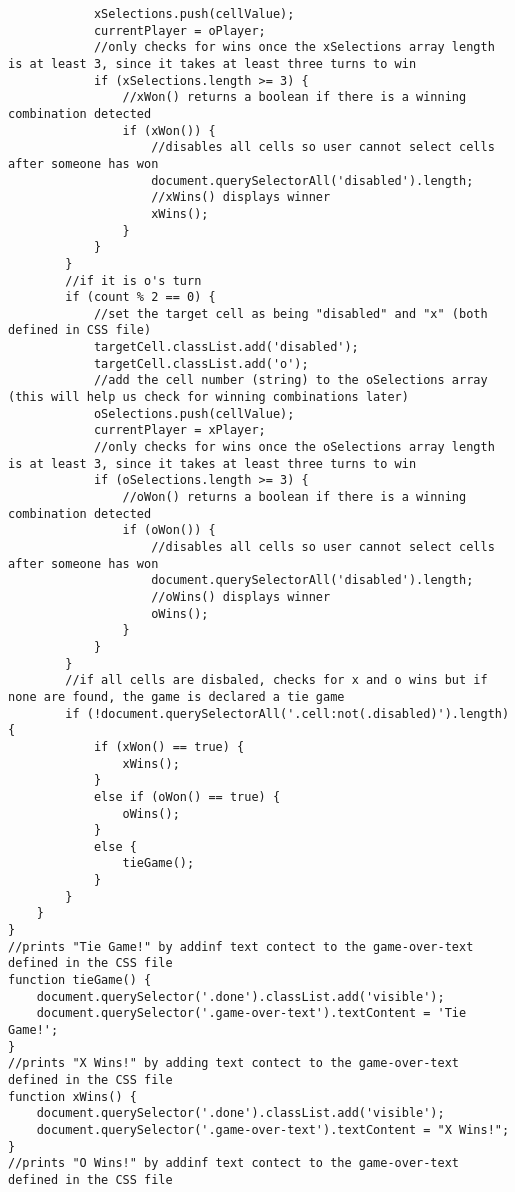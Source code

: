 \documentclass{article}
\theoremstyle{theorem}
\theoremstyle{definition}
\theoremstyle{remark}
\begin{document}
\begin{lstlisting}
            xSelections.push(cellValue);
            currentPlayer = oPlayer;
            //only checks for wins once the xSelections array length is at least 3, since it takes at least three turns to win
            if (xSelections.length >= 3) {
                //xWon() returns a boolean if there is a winning combination detected
                if (xWon()) {
                    //disables all cells so user cannot select cells after someone has won
                    document.querySelectorAll('disabled').length;
                    //xWins() displays winner
                    xWins();
                }
            }
        }
        //if it is o's turn
        if (count % 2 == 0) {
            //set the target cell as being "disabled" and "x" (both defined in CSS file)
            targetCell.classList.add('disabled');
            targetCell.classList.add('o');
            //add the cell number (string) to the oSelections array (this will help us check for winning combinations later)
            oSelections.push(cellValue);
            currentPlayer = xPlayer;
            //only checks for wins once the oSelections array length is at least 3, since it takes at least three turns to win
            if (oSelections.length >= 3) {
                //oWon() returns a boolean if there is a winning combination detected
                if (oWon()) {
                    //disables all cells so user cannot select cells after someone has won
                    document.querySelectorAll('disabled').length;
                    //oWins() displays winner
                    oWins();
                }
            }
        }
        //if all cells are disbaled, checks for x and o wins but if none are found, the game is declared a tie game
        if (!document.querySelectorAll('.cell:not(.disabled)').length) {
            if (xWon() == true) {
                xWins();
            }
            else if (oWon() == true) {
                oWins();
            }
            else {
                tieGame();
            }
        }
    }
}
//prints "Tie Game!" by addinf text contect to the game-over-text defined in the CSS file
function tieGame() {
    document.querySelector('.done').classList.add('visible');
    document.querySelector('.game-over-text').textContent = 'Tie Game!';
}
//prints "X Wins!" by adding text contect to the game-over-text defined in the CSS file
function xWins() {
    document.querySelector('.done').classList.add('visible');
    document.querySelector('.game-over-text').textContent = "X Wins!";
}
//prints "O Wins!" by addinf text contect to the game-over-text defined in the CSS file

\end{lstlisting}
\end{document}
